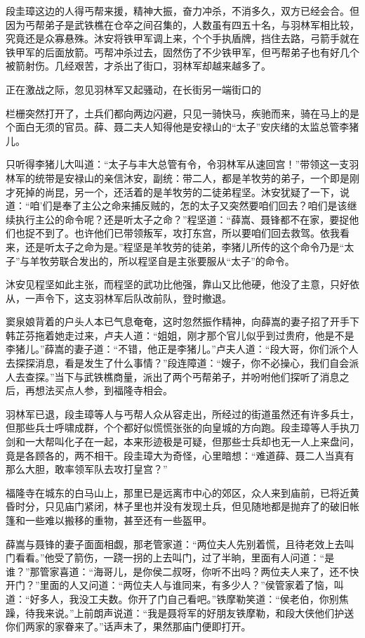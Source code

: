 \documentclass[12pt,oneside]{book}
\begin{document}
段圭璋这边的人得丐帮来援，精神大振，奋力冲杀，不消多久，双方已经会合。但因为丐帮弟子是武铁樵在仓卒之间召集的，人数虽有四五十名，与羽林军相比较，究竟还是众寡悬殊。沐安将铁甲军调上来，个个手执盾牌，挡住去路，弓箭手就在铁甲军的后面放箭。丐帮冲杀过去，固然伤了不少铁甲军，但丐帮弟子也有好几个被箭射伤。几经艰苦，才杀出了街口，羽林军却越来越多了。

正在激战之际，忽见羽林军又起骚动，在长街另一端街口的

栏栅突然打开了，土兵们都向两边闪避，只见一骑快马，疾驰而来，骑在马上的是个面白无须的官员。薛、聂二夫人知得他是安禄山的``太子''安庆绪的太监总管李猪儿。

只听得李猪儿大叫道：``太子与丰大总管有令，令羽林军从速回宫！''带领这一支羽林军的统带是安禄山的亲信沐安，副统：带二人，都是羊牧劳的弟子，一个即是刚才死掉的尚昆，另一个，还活着的是羊牧劳的二徒弟程坚。沐安犹疑了一下，说道：``咱'们是奉了主公之命来捕反贼的，怎的太子又突然要咱们回去？咱们是该继续执行主公的命令呢？还是听太子之命？''程坚道：``薛嵩、聂锋都不在家，要捉他们也捉不到了。也许他们已带领叛军，攻打东宫，所以要咱们回去救驾。依我看来，还是听太子之命为是。''程坚是羊牧劳的徒弟，李猪儿所传的这个命令乃是``太子''与羊牧劳联合发出的，所以程坚自是主张要服从``太子''的命令。

沐安见程坚如此主张，而程坚的武功比他强，靠山又比他硬，他没了主意，只好依从，一声令下，这支羽林军后队改前队，登时撤退。

窦泉娘背着的户头人本已气息奄奄，这时忽然振作精神，向薛嵩的妻子招了开手下韩芷芬拖着她走过来，卢夫人道：``姐姐，刚才那个官儿似乎到过贵府，他是不是李猪儿。''薛嵩的妻子道：``不错，他正是李猪儿。''卢夫人道：``段大哥，你们派个人去探探消息，看是发生了什么事情？''段连障道：``嫂子，你不必操心，我们自会派人去查探。''当下与武铁樵商量，派出了两个丐帮弟子，并吩咐他们探听了消息之后，再想法买点人参，到福隆寺相会。

羽林军已退，段圭璋等人与丐帮人众从容走出，所经过的街道虽然还有许多兵士，但那些兵士呼啸成群，个个都好似慌慌张张的向皇城的方向跑。段圭璋等人手执刀剑和一大帮叫化子在一起，本来形迹极是可疑，但那些士兵却也无一人上来盘问，竟是各顾各的，两不相干。段圭璋大为奇怪，心里暗想：``难道薛、聂二人当真有那么大胆，敢率领军队去攻打皇宫？''

福隆寺在城东的白马山上，那里已是远离市中心的郊区，众人来到庙前，已将近黄昏时分，只见庙门紧闭，林子里也并没有发现土兵，但见随地都是抛弃了的破旧帐篷和一些难以搬移的重物，甚至还有一些盔甲。

薛嵩与聂锋的妻子面面相觑，那老管家道：``两位夫人先别着慌，且待老效上去叫门看看。''他受了箭伤，一跷一拐的上去叫门，过了半晌，里面有人问道：``是谁？''那管家喜道：``海哥儿，是你侯二叔呀，你听不出吗？两位夫人来了，还不快开门？''里面的人又问道：``两位夫人与谁同来，有多少人？''侯管家着了恼，叫道：``好多人，我没工夫数。你开了门自己看吧。''铁摩勒笑道：``侯老伯，你别焦躁，待我来说。''上前朗声说道：``我是聂将军的好朋友铁摩勒，和段大侠他们护送你们两家的家眷来了。''话声未了，果然那庙门便即打开。
\end{document}
